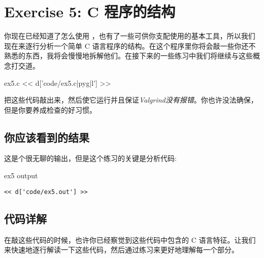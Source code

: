 \chapter{Exercise 5: C 程序的结构}

你现在已经知道了怎么使用  ，也有了一些可供你支配使用的基本工具，所以我们现在来逐行分析一个简单 C 语言程序的结构。在这个程序里你将会敲一些你还不熟悉的东西，我将会慢慢地拆解他们。在接下来的一些练习中我们将继续与这些概念打交道。

\begin{code}{ex5.c}
<< d['code/ex5.c|pyg|l'] >>
\end{code}

把这些代码敲出来，然后使它运行并且保证\emph{Valgrind没有报错}。你也许没法确保，但是你要养成检查的好习惯。

\section{你应该看到的结果}

这是个很无聊的输出，但是这个练习的关键是分析代码:

\begin{code}{ex5 output}
\begin{lstlisting}
<< d['code/ex5.out'] >>
\end{lstlisting}
\end{code}

\section{代码详解}

在敲这些代码的时候，也许你已经察觉到这些代码中包含的 C 语言特征。让我们来快速地逐行解读一下这些代码，然后通过练习来更好地理解每一个部分。

